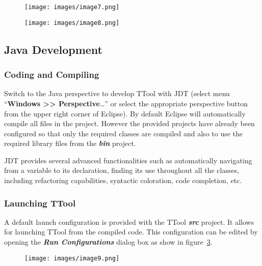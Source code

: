 \documentclass[12pt]{article}
\begin{document}
\begin{figure}[H]
\begin{center}
\texttt{[image: images/image7.png]}
\end{center}
\caption{}
\label{fig:image6}
\end{figure}

\begin{figure}[H]
\begin{center}
\texttt{[image: images/image8.png]}
\end{center}
\caption{}
\label{fig:image7}
\end{figure}

\subsection{Java Development}

\subsubsection{Coding and Compiling}

Switch to the Java perspective to develop TTool with JDT (select menu
``\textbf{Windows >> Perspective}\ldots'' or select the appropriate perspective button from
the upper right corner of Eclipse). By default Eclipse will automatically
compile all files in the project. However the provided projects have already
been configured so that only the required classes are compiled and also to use
the required library files from the \textbf{\textit{bin}} project.

JDT provides several advanced functionalities such as automatically navigating
from a variable to its declaration, finding its use throughout all the classes,
including refactoring capabilities, syntactic coloration, code completion, etc.

\subsubsection{Launching TTool}
\label{sec:launch}

A default launch configuration is provided with the TTool \textbf{\textit{src}} project.
It allows for launching TTool from the compiled code. This configuration can be
edited by opening the \textbf{\textit{Run Configurations}} dialog box as show in figure~\ref{fig:image8}.

\begin{figure}[H]
\begin{center}
\texttt{[image: images/image9.png]}
\end{center}
\caption{}
\label{fig:image8}
\end{figure}
\end{document}
